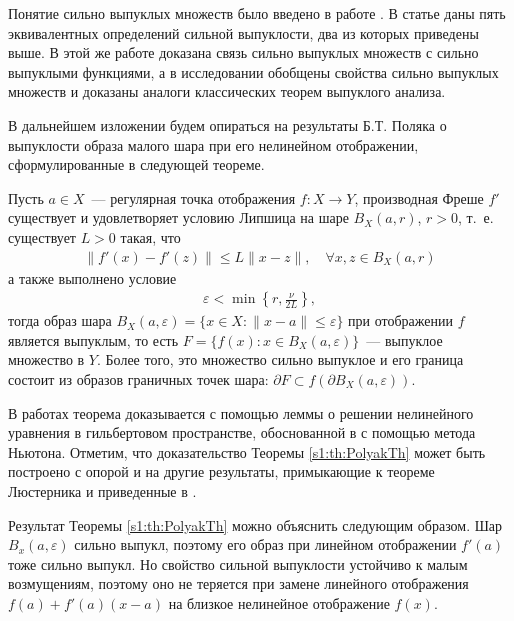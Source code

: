 \documentclass[../main.tex]{subfiles}
\begin{document}
Понятие сильно выпуклых множеств было введено в работе \cite{Polyak1966}.
В статье \cite{vial} даны пять эквивалентных определений сильной выпуклости, два из которых приведены выше. 
В этой же работе доказана связь сильно выпуклых множеств с сильно выпуклыми функциями, а в исследовании \cite{Polovinkin} обобщены свойства сильно выпуклых множеств и доказаны аналоги классических теорем выпуклого анализа.

В дальнейшем изложении будем опираться на результаты Б.Т. Поляка о выпуклости образа малого шара при его нелинейном отображении, сформулированные в следующей теореме. 
\begin{theorem}\label{s1:th:PolyakTh}
 Пусть $a \in X$~--- регулярная точка отображения $f: X \rightarrow Y$, производная Фреше $f'$ существует и удовлетворяет условию Липшица на шаре $B_X(a,r) $, $r > 0$, т.~е. существует $ L > 0 $ такая, что
 \begin{gather*}%
 \| f'(x) - f'(z) \| \leqslant L \| x - z \|, \quad \forall x,z \in B_X(a,r)
 \end{gather*}
 а также выполнено условие
 \begin{gather*}
 \varepsilon < \min\left\{r,\frac{\nu}{2L}\right\},
 \end{gather*}
 тогда образ шара $B_X(a,\varepsilon) = \{x \in X: \| x - a\| \leqslant \varepsilon\}$ при отображении $f$ является выпуклым, то есть $F = \{f(x): x \in B_X(a,\varepsilon)\}$~--- выпуклое множество в $Y$.
 Более того, это множество сильно выпуклое и его граница состоит из образов граничных точек шара: $\partial F \subset f(\partial B_X(a,\varepsilon))$.
\end{theorem}
 
В работах \cite{Polyak2001, Polyak2001ru} теорема доказывается с помощью леммы о решении нелинейного уравнения в гильбертовом пространстве, обоснованной в \cite{Polyak1964} с помощью метода Ньютона.
Отметим, что доказательство Теоремы \ref{s1:th:PolyakTh} может быть построено с опорой и на другие результаты, примыкающие к теореме Люстерника и приведенные в \cite{Dmitruk1980, Ioffe}.
 
Результат Теоремы \ref{s1:th:PolyakTh} можно объяснить следующим образом.
Шар $B_x(a,\varepsilon)$ сильно выпукл, поэтому его образ при линейном отображении $f'(a)$ тоже сильно выпукл.
Но свойство сильной выпуклости устойчиво к малым возмущениям, поэтому оно не теряется при замене линейного отображения $f(a) + f'(a)(x - a)$ на близкое нелинейное отображение $f(x)$. 
 
\end{document}

